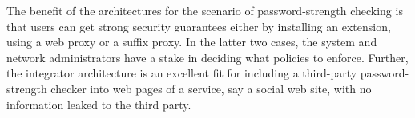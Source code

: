 \documentclass{llncs}
\begin{document}
The benefit of the architectures for the scenario of password-strength checking is
that users can get strong security guarantees either by installing an
extension, using a web proxy or a suffix proxy. In the latter two
cases, the system and network administrators have a stake in deciding
what policies to enforce. Further, the integrator architecture is an
excellent fit for including a third-party password-strength checker
into web pages of a service, say a social web site, with no
information leaked to the third party.




\end{document}
